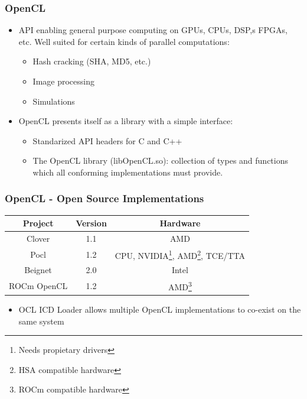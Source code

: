 \documentclass{smilebeamer}
\begin{document}
\begin{frame}
\frametitle{OpenCL}
\begin{itemize}
  \item API enabling general purpose computing on GPUs, CPUs, DSP,s FPGAs, etc.
  Well suited for certain kinds of parallel computations:
  \begin{itemize}
    \item Hash cracking (SHA, MD5, etc.)
    \item Image processing
    \item Simulations
  \end{itemize}
  \item OpenCL presents itself as a library with a simple interface:
  \begin{itemize}
    \item Standarized API headers for C and C++
    \item The OpenCL library (libOpenCL.so): collection of types and functions
    which all conforming implementations must provide.
  \end{itemize}
\end{itemize}
\end{frame}

\begin{frame}
\frametitle{OpenCL - Open Source Implementations}
\centering
{
\begin{tabular}{c|c|c}
\textbf{Project} & \textbf{Version} & \textbf{Hardware} \\
\hline
Clover & 1.1 & AMD\\
Pocl & 1.2 & CPU, NVIDIA\footnote{Needs propietary drivers}, AMD\footnote{HSA
compatible hardware}, TCE/TTA\\
Beignet & 2.0 & Intel\\
ROCm OpenCL & 1.2 & AMD\footnote{ROCm compatible hardware}\\
\end{tabular}
}
\vfill
\begin{itemize}
  \item OCL ICD Loader allows multiple OpenCL implementations to co-exist on
  the same system
\end{itemize}
\end{frame}
\end{document}
